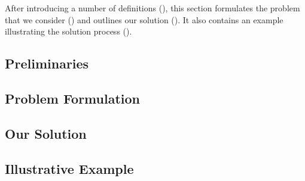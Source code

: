 After introducing a number of definitions (), this section
formulates the problem that we consider () and outlines our
solution (). It also contains an example illustrating the
solution process ().

\subsection{Preliminaries} 


\subsection{Problem Formulation} 



\subsection{Our Solution} 


\subsection{Illustrative Example} 

